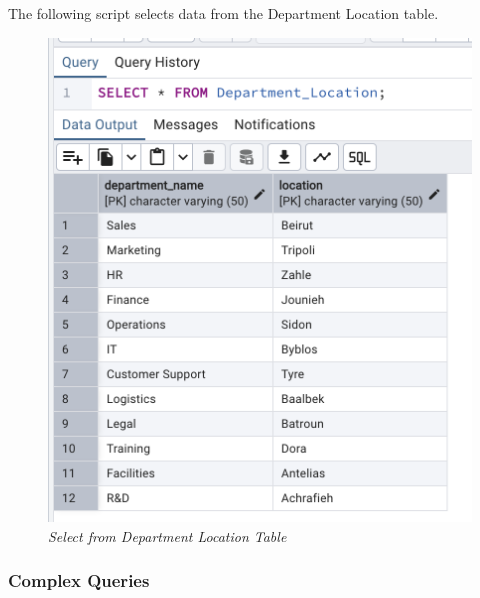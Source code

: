 The following script selects data from the Department Location table.


\begin{figure}[H]
  \centering
  \includegraphics[width=1\textwidth]{images/sql/select/department_location.png}
  \caption{\textit{Select from Department Location Table}}
\end{figure}

\subsubsection{Complex Queries}




